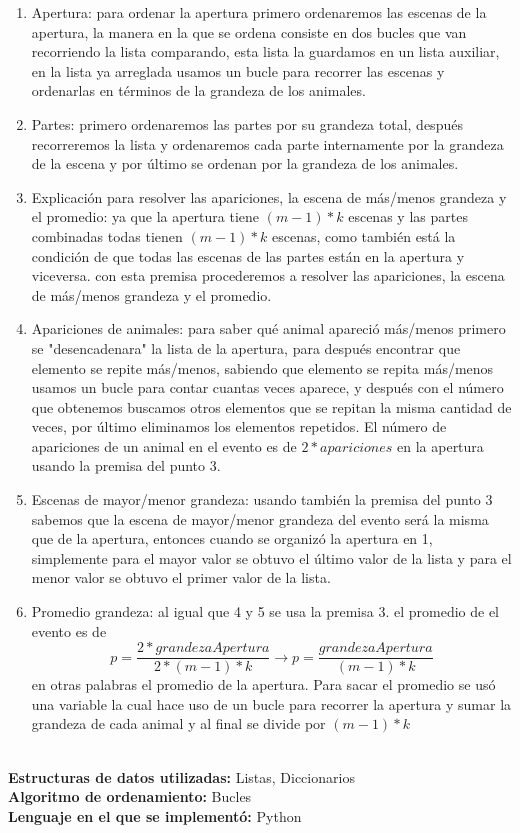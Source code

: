 \documentclass{article}
\begin{document}
			\begin{enumerate}
				\item Apertura: para ordenar la apertura primero ordenaremos las escenas de la apertura, la manera en la que se ordena consiste en dos bucles que van recorriendo la lista comparando, esta lista la guardamos en un lista auxiliar, en la lista ya arreglada usamos un bucle para recorrer las escenas y ordenarlas en términos de la grandeza de los animales.
				\item Partes: primero ordenaremos las partes por su grandeza total, después recorreremos la lista y ordenaremos cada parte internamente por la grandeza de la escena y por último se ordenan por la grandeza de los animales.
				\item Explicación para resolver las apariciones, la escena de más/menos grandeza y el promedio: ya que la apertura tiene $(m-1)*k$ escenas y las partes combinadas todas tienen $(m-1)*k$ escenas, como también está la condición de que todas las escenas de las partes están en la apertura y viceversa. con esta premisa procederemos a resolver las apariciones, la escena de más/menos grandeza y el promedio.
				\item Apariciones de animales: para saber qué animal apareció más/menos primero se "desencadenara" la lista de la apertura, para después encontrar que elemento se repite más/menos, sabiendo que elemento se repita más/menos usamos un bucle para contar cuantas veces aparece, y después con el número que obtenemos buscamos otros elementos que se repitan la misma cantidad de veces, por último eliminamos los elementos repetidos. El número de apariciones de un animal en el evento es de $2*apariciones$ en la apertura usando la premisa del punto 3.
				\item Escenas de mayor/menor grandeza: usando también la premisa del punto 3 sabemos que la escena de mayor/menor grandeza del evento será la misma que de la apertura, entonces cuando se organizó la apertura en 1, simplemente para el mayor valor se obtuvo el último valor de la lista y para el menor valor se obtuvo el primer valor de la lista.
				\item Promedio grandeza: al igual que 4 y 5 se usa la premisa 3. el  promedio de el evento es de 
				\begin{equation}
					p=\frac{2*grandezaApertura}{2*(m-1)*k} \rightarrow p=\frac{grandezaApertura}{(m-1)*k}
				\end{equation}
				en otras palabras el promedio de la apertura. Para sacar el promedio se usó una variable la cual hace uso de un bucle para recorrer la apertura y sumar la grandeza de cada animal y al final se divide por $(m-1)*k$
			\end{enumerate}\\
			\textbf{Estructuras de datos utilizadas:} Listas, Diccionarios\\ 
			\textbf{Algoritmo de ordenamiento:} Bucles\\
			\textbf{Lenguaje en el que se implementó:} Python
		
\end{document}
